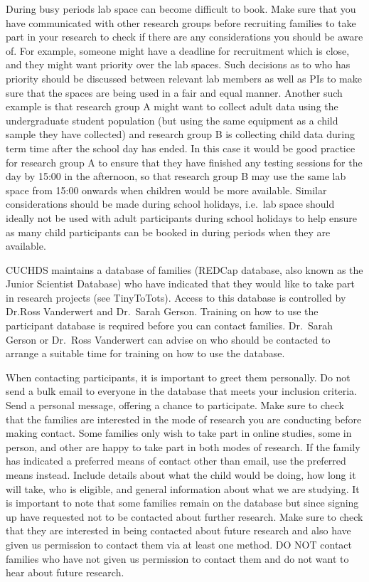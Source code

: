 \documentclass[
  12pt,
]{book}
\begin{document}
During busy periods lab space can become difficult to book. Make sure that you have communicated with other research groups before recruiting families to take part in your research to check if there are any considerations you should be aware of. For example, someone might have a deadline for recruitment which is close, and they might want priority over the lab spaces. Such decisions as to who has priority should be discussed between relevant lab members as well as PIs to make sure that the spaces are being used in a fair and equal manner. Another such example is that research group A might want to collect adult data using the undergraduate student population (but using the same equipment as a child sample they have collected) and research group B is collecting child data during term time after the school day has ended. In this case it would be good practice for research group A to ensure that they have finished any testing sessions for the day by 15:00 in the afternoon, so that research group B may use the same lab space from 15:00 onwards when children would be more available. Similar considerations should be made during school holidays, i.e.~lab space should ideally not be used with adult participants during school holidays to help ensure as many child participants can be booked in during periods when they are available.

CUCHDS maintains a database of families (REDCap database, also known as the Junior Scientist Database) who have indicated that they would like to take part in research projects (see TinyToTots). Access to this database is controlled by Dr.Ross Vanderwert and Dr.~Sarah Gerson. Training on how to use the participant database is required before you can contact families. Dr.~Sarah Gerson or Dr.~Ross Vanderwert can advise on who should be contacted to arrange a suitable time for training on how to use the database.

When contacting participants, it is important to greet them personally. Do not send a bulk email to everyone in the database that meets your inclusion criteria. Send a personal message, offering a chance to participate. Make sure to check that the families are interested in the mode of research you are conducting before making contact. Some families only wish to take part in online studies, some in person, and other are happy to take part in both modes of research. If the family has indicated a preferred means of contact other than email, use the preferred means instead. Include details about what the child would be doing, how long it will take, who is eligible, and general information about what we are studying. It is important to note that some families remain on the database but since signing up have requested not to be contacted about further research. Make sure to check that they are interested in being contacted about future research and also have given us permission to contact them via at least one method. DO NOT contact families who have not given us permission to contact them and do not want to hear about future research.
\end{document}
